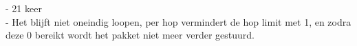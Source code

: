 - 21 keer\\
- Het blijft niet oneindig loopen, per hop vermindert de hop limit met 1, en zodra deze 0 bereikt wordt het pakket niet meer verder gestuurd.